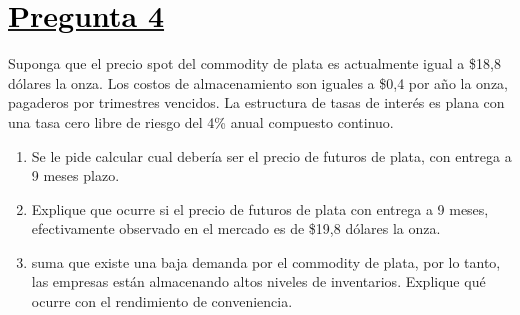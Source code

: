 \documentclass[12pt]{article}
\newcommand{\subrayadoRojo}[1]{{\color{rojoudp}\underline{\textcolor{black}{#1}}}}
\begin{document}
\section*{\subrayadoRojo{Pregunta 4}}
Suponga que el precio spot del commodity de plata es actualmente igual a \$18,8 dólares  
la onza. Los costos de almacenamiento son iguales a \$0,4 por año la onza, pagaderos por
 trimestres vencidos. La estructura de tasas de interés es plana con una tasa cero libre 
 de riesgo del 4\% anual compuesto continuo.
 \begin{enumerate}[label=\textbf{\alph*)}]
    \item   Se le pide calcular cual debería ser el precio de futuros de plata, con entrega a 9 meses plazo.
    \item 	Explique que ocurre si el precio de futuros de plata con entrega a 9 meses,
     efectivamente observado en el mercado es de \$19,8 dólares la onza.
    \item suma que existe una baja demanda por el commodity de plata, por lo tanto,
     las empresas están almacenando altos niveles de inventarios. 
     Explique qué ocurre con el rendimiento de conveniencia.

\end{enumerate}
\end{document}
